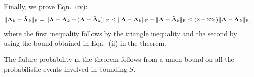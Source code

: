 Finally, we prove Eqn.~(iv):
$$ \mbox{}\|{\bm{\mathrm{A}}}_k -  \tilde{{\bm{\mathrm{A}}}}_k \|_\mathrm{F} = \mbox{}\|{\bm{\mathrm{A}}}-{\bm{\mathrm{A}}}_k - ({\bm{\mathrm{A}}}-\tilde{{\bm{\mathrm{A}}}}_k) \|_\mathrm{F} \leq \mbox{}\|{\bm{\mathrm{A}}} - {\bm{\mathrm{A}}}_k\|_\mathrm{F} + \mbox{}\|{\bm{\mathrm{A}}} -  \tilde{{\bm{\mathrm{A}}}}_k \|_\mathrm{F} \le (2+22\varepsilon) \mbox{}\|{\bm{\mathrm{A}}}-{\bm{\mathrm{A}}}_k\|_\mathrm{F},$$
where the first inequality follows by the triangle inequality and the second by using the bound obtained in
Eqn.~(ii) in the theorem.


The failure probability in the theorem follows from a union bound on all the probabilistic events involved in bounding $S$.


